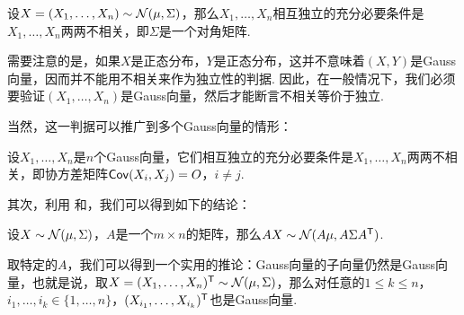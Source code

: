 \begin{theorem}\label{thm:gauss-vector-independence}
设$X=(X_1,\dots,X_n)\sim\mathcal{N}(\mu,\Sigma)$，那么$X_1,\dots,X_n$相互独立的充分必要条件是$X_1,\dots,X_n$两两不相关，即$\Sigma$是一个对角矩阵. 
\end{theorem}

需要注意的是，如果$X$是正态分布，$Y$是正态分布，这并不意味着$(X,Y)$是Gauss向量，因而并不能用不相关来作为独立性的判据. 因此，在一般情况下，我们必须要验证$(X_1,\dots,X_n)$是Gauss向量，然后才能断言不相关等价于独立. 

当然，这一判据可以推广到多个Gauss向量的情形：

\begin{corollary}\label{cor:gauss-vector-independence-2}
设$X_1,\dots,X_n$是$n$个Gauss向量，它们相互独立的充分必要条件是$X_1,\dots,X_n$两两不相关，即协方差矩阵$\mathsf{Cov}(X_i,X_j)=O$，$i\neq j$.
\end{corollary}


其次，利用 和，我们可以得到如下的结论：

\begin{theorem}\label{thm:gauss-vector-linear}
设$X\sim\mathcal{N}(\mu,\Sigma)$，$A$是一个$m\times n$的矩阵，那么$AX\sim\mathcal{N}(A\mu,A\Sigma A^{\mathsf{T}})$.
\end{theorem}

取特定的$A$，我们可以得到一个实用的推论：Gauss向量的子向量仍然是Gauss向量，也就是说，取$X=(X_1,\dots,X_n)^{\mathsf{T}}\sim\mathcal{N}(\mu,\Sigma)$，那么对任意的$1\leq k\leq n$，$i_1,\dots,i_k\in\{1,\dots,n\}$，$(X_{i_1},\dots,X_{i_k})^{\mathsf{T}}$也是Gauss向量. 


\endgroup
